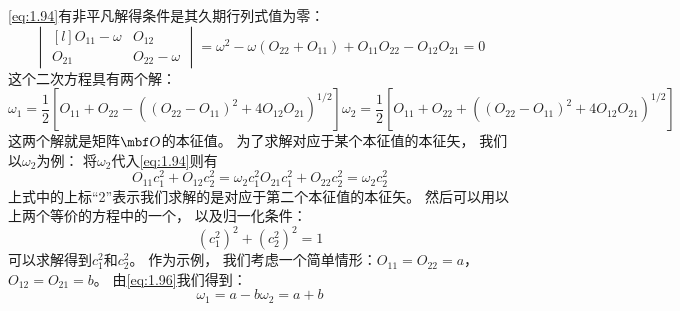 \autoref{eq:1.94}有非平凡解得条件是其久期行列式值为零：
\begin{equation}
 \begin{vmatrix*}[l]
     O_{11}-\omega &O_{12} \\ O_{21} & O_{22}-\omega
 \end{vmatrix*} = \omega^2 - \omega\left(O_{22} + O_{11}\right) + O_{11}O_{22} - O_{12}O_{21} = 0
 \label{eq:1.95}
\end{equation}
这个二次方程具有两个解：
\begin{subequations}
 \begin{equation}
     \omega_1 = \frac{1}{2}\left[
     O_{11} + O_{22} - \left(\left(O_{22}-O_{11}\right)^2+4O_{12}O_{21}\right)^{1/2}
     \right]
     \label{eq:1.96a}
 \end{equation}
 \begin{equation}
     \omega_2 = \frac{1}{2}\left[
     O_{11} + O_{22} + \left(\left(O_{22}-O_{11}\right)^2+4O_{12}O_{21}\right)^{1/2}
     \right]
     \label{eq:1.96b}
 \end{equation}
 \label{eq:1.96}
\end{subequations}
这两个解就是矩阵$\mbf O$的本征值。
为了求解对应于某个本征值的本征矢，
我们以$\omega_2$为例：
将$\omega_2$代入\autoref{eq:1.94}则有
\begin{subequations}
 \begin{equation}
     O_{11}c_1^2 + O_{12}c_2^2 = \omega_2 c_1^2
     \label{eq:1.97a}
 \end{equation}
 \begin{equation}
     O_{21}c_1^2 + O_{22}c_2^2 = \omega_2 c_2^2
     \label{eq:1.97b}
 \end{equation}
 \label{eq:1.97}
\end{subequations}
上式中的上标``2''表示我们求解的是对应于第二个本征值的本征矢。
然后可以用以上两个等价的方程中的一个，
以及归一化条件：
\begin{equation}
 \left(c_1^2\right)^2 + \left(c_2^2\right)^2 = 1
 \label{eq:1.98}
\end{equation}
可以求解得到$c_1^2$和$c_2^2$。
作为示例，
我们考虑一个简单情形：$O_{11} = O_{22} = a$，$O_{12} = O_{21} = b$。
由\autoref{eq:1.96}我们得到：
\begin{subequations}
 \begin{equation}
     \omega_1 = a - b
     \label{eq:1.99a}
 \end{equation}
 \begin{equation}
     \omega_2 = a + b
     \label{eq:1.99b}
 \end{equation}
 \label{eq:1.99}
\end{subequations}
